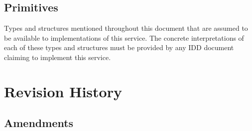 \documentclass[a4paper]{arrowhead}
\newcommand{\pdef}[1]{{\textcolor{ArrowheadGrey}{#1\label{sec:model:primitives:#1}
      \label{sec:model:primitives:#1s}\label{sec:model:primitives:#1es}}}}
\begin{document}

\subsection{Primitives}
\label{sec:model:primitives}

Types and structures mentioned throughout this document that are assumed to be available to implementations of this service.
The concrete interpretations of each of these types and structures must be provided by any IDD document claiming to implement this service.







\newpage

\section{Revision History}
\subsection{Amendments}
\end{document}
